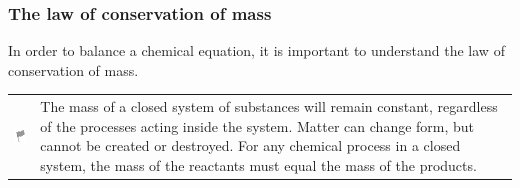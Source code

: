       
      \label{m38726*uid9}
            \subsubsection{ The law of conservation of mass}
            \nopagebreak
            
        
        \label{m38726*id63198}In order to balance a chemical equation, it is important to understand the law of conservation of mass.\par 
\label{m38726*fhsst!!!underscore!!!id145}\begin{definition}
	  \begin{tabular*}{15 cm}{m{15 mm}m{}}
	\hspace*{-50pt}  \includegraphics[width=0.5in]{col11305.imgs/psflag2.png}   & \Definition{   \label{id2463440}\textbf{ The law of conservation of mass }} { \label{m38726*meaningfhsst!!!underscore!!!id145}
        \label{m38726*id63208}The mass of a closed system of substances will remain constant, regardless of the processes acting inside the system. Matter can change form, but cannot be created or destroyed. For any chemical process in a closed system, the mass of the reactants must equal the mass of the products. \par 
         } 
      \end{tabular*}
      \end{definition}

